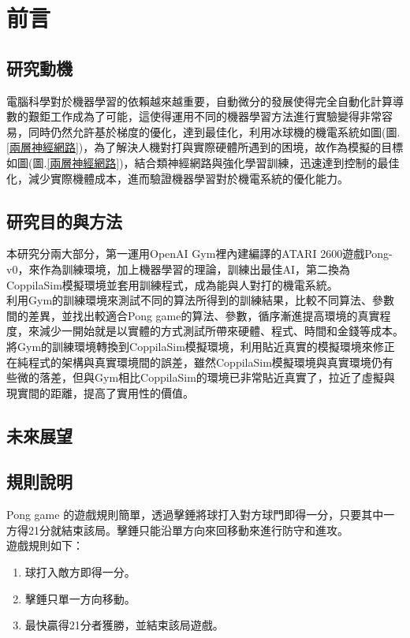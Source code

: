 \documentclass[14pt,a4paper]{report}  %
\begin{document}
\chapter{前言}
\renewcommand{\baselinestretch}{10.0} %
\setcounter{page}{1}  %
\fontsize{14pt}{2.5pt}\sectionef
\section{研究動機}
電腦科學對於機器學習的依賴越來越重要，自動微分的發展使得完全自動化計算導數的艱鉅工作成為了可能，這使得運用不同的機器學習方法進行實驗變得非常容易，同時仍然允許基於梯度的優化，達到最佳化，利用冰球機的機電系統如圖(圖.\ref{兩層神經網路})，為了解決人機對打與實際硬體所遇到的困境，故作為模擬的目標如圖(圖.\ref{兩層神經網路})，結合類神經網路與強化學習訓練，迅速達到控制的最佳化，減少實際機體成本，進而驗證機器學習對於機電系統的優化能力。
 
\section{研究目的與方法}
 本研究分兩大部分，第一運用OpenAI Gym裡內建編譯的ATARI 2600遊戲Pong-v0，來作為訓練環境，加上機器學習的理論，訓練出最佳AI，第二換為CoppilaSim模擬環境並套用訓練程式，成為能與人對打的機電系統。\\
 
 利用Gym的訓練環境來測試不同的算法所得到的訓練結果，比較不同算法、參數間的差異，並找出較適合Pong game的算法、參數，循序漸進提高環境的真實程度，來減少一開始就是以實體的方式測試所帶來硬體、程式、時間和金錢等成本。\\

 將Gym的訓練環境轉換到CoppilaSim模擬環境，利用貼近真實的模擬環境來修正在純程式的架構與真實環境間的誤差，雖然CoppilaSim模擬環境與真實環境仍有些微的落差，但與Gym相比CoppilaSim的環境已非常貼近真實了，拉近了虛擬與現實間的距離，提高了實用性的價值。
\section{未來展望}
\qquad 
\section{規則說明}
 Pong game 的遊戲規則簡單，透過擊錘將球打入對方球門即得一分，只要其中一方得21分就結束該局。擊錘只能沿單方向來回移動來進行防守和進攻。\\
遊戲規則如下：
\begin{enumerate}
\item 球打入敵方即得一分。
\item 擊錘只單一方向移動。
\item 最快贏得21分者獲勝，並結束該局遊戲。
\end{enumerate}
\end{document}
